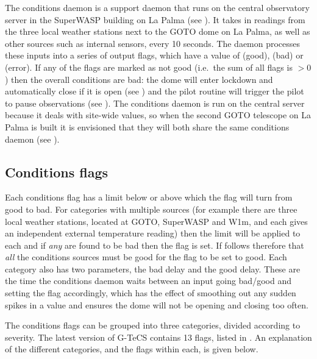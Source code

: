 \begin{colsection}
\begin{colsection}
The conditions daemon is a support daemon that runs on the central observatory server in the SuperWASP building on La Palma (see ). It takes in readings from the three local weather stations next to the GOTO dome on La Palma, as well as other sources such as internal sensors, every 10 seconds. The daemon processes these inputs into a series of output flags, which have a value of  (good),  (bad) or  (error). If any of the flags are marked as not good (i.e.\ the sum of all flags is $>0$) then the overall conditions are bad: the dome will enter lockdown and automatically close if it is open (see ) and the pilot  routine will trigger the pilot to pause observations (see ). The conditions daemon is run on the central server because it deals with site-wide values, so when the second GOTO telescope on La Palma is built it is envisioned that they will both share the same conditions daemon (see ).

\end{colsection}

\subsection{Conditions flags}
\label{sec:conditions_flags}
\begin{colsection}

Each conditions flag has a limit below or above which the flag will turn from good to bad. For categories with multiple sources (for example there are three local weather stations, located at GOTO, SuperWASP and W1m, and each gives an independent external temperature reading) then the limit will be applied to each and if \textit{any} are found to be bad then the flag is set. If follows therefore that \textit{all} the conditions sources must be good for the flag to be set to good. Each category also has two parameters, the bad delay and the good delay. These are the time the conditions daemon waits between an input going bad/good and setting the flag accordingly, which has the effect of smoothing out any sudden spikes in a value and ensures the dome will not be opening and closing too often.

The conditions flags can be grouped into three categories, divided according to severity. The latest version of G-TeCS contains 13 flags, listed in . An explanation of the different categories, and the flags within each, is given below.


\end{colsection}
\end{colsection}
